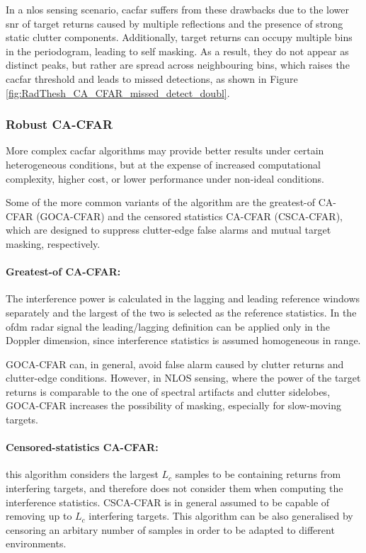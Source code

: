 In a \gls{nlos} sensing scenario, \gls{cacfar} suffers from these drawbacks due to the lower \gls{snr} of target returns caused by multiple reflections and the presence of strong static clutter components.
Additionally, target returns can occupy multiple bins in the periodogram, leading to self masking. 
As a result, they do not appear as distinct peaks, but rather are spread across neighbouring bins, which raises the \gls{cacfar} threshold and leads to missed detections, as shown in Figure \ref{fig:RadThesh_CA_CFAR_missed_detect_doubl}.

\subsubsection{Robust CA-CFAR}
More complex \gls{cacfar} algorithms may provide better results under certain heterogeneous conditions, but at the expense of increased computational complexity, higher cost, or lower performance under non-ideal conditions.

Some of the more common variants of the algorithm are the greatest-of CA-CFAR (GOCA-CFAR) and the censored statistics CA-CFAR (CSCA-CFAR), which are designed to suppress clutter-edge false alarms and mutual target masking, respectively.


\paragraph{Greatest-of CA-CFAR:}
The interference power is calculated in the lagging and leading reference windows separately and the largest of the two is selected as the reference statistics. In the \gls{ofdm} radar signal the leading/lagging definition can be applied only in the Doppler dimension, since interference statistics is assumed homogeneous in range.

GOCA-CFAR can, in general, avoid false alarm caused by clutter returns and clutter-edge conditions. However, in NLOS sensing, where the power of the target returns is comparable to the one of spectral artifacts and clutter sidelobes, GOCA-CFAR increases the possibility of masking, especially for slow-moving targets.
 
 
\paragraph{Censored-statistics CA-CFAR:}
this algorithm considers the largest $L_c$ samples to be containing returns from interfering targets, and therefore does not consider them when computing the interference statistics. CSCA-CFAR is in general assumed to be capable of removing up to $L_c$ interfering targets.
This algorithm can be also generalised by censoring an arbitary number of samples in order to be adapted to different environments. 

